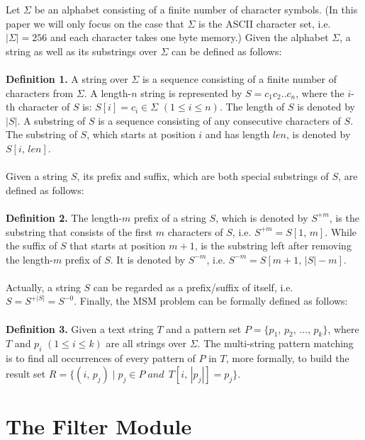 \documentclass{article}
\begin{document}
Let $\Sigma$ be an \textsf{alphabet} consisting of a finite number of
character symbols. (In this paper we will only focus on the case that
$\Sigma$ is the ASCII character set, i.e. $|\Sigma| = 256$ and each
character takes one byte memory.) Given the alphabet $\Sigma$, a
\textsf{string} as well as its \textsf{substrings} over
$\Sigma$ can be defined as follows:\\
\\
\textbf{Definition 1.} A \textsf{string} over $\Sigma$ is a sequence
consisting of a finite number of characters from $\Sigma$. A
length-$n$ string is represented by $S = c_1c_2..c_n$, where the
$i$-th character of $S$ is: $S[i] = c_i \in \Sigma$
$(1 \leq i \leq n)$. The length of $S$ is denoted by $|S|$. A
\textsf{substring} of $S$ is a sequence consisting of any consecutive
characters of $S$. The substring of $S$, which starts at
position $i$ and has length $len$, is denoted by $S[i,\,len]$.\\
\\
Given a string $S$, its \textsf{prefix} and \textsf{suffix},
which are both special substrings of $S$, are defined as follows:\\
\\
\textbf{Definition 2.} The length-$m$ \textsf{prefix} of a string $S$,
which is denoted by $S^{+m}$, is the substring that consists of the
first $m$ characters of $S$, i.e. $S^{+m}=S[1,\,m]$.  While the
\textsf{suffix} of $S$ that starts at position $m+1$, is the substring
left after removing the length-$m$ prefix of $S$. It is
denoted by $S^{-m}$, i.e. $S^{-m} = S[m+1,\,|S|-m]$.\\
\\
Actually, a string $S$ can be regarded as a prefix/suffix of itself,
i.e. $S=S^{+|S|}=S^{-0}$. Finally, the MSM problem can be
formally defined as follows: \\
\\
\textbf{Definition 3.} Given a text string $T$ and a pattern set
$P=\{p_1,\,p_2,\,\dots,\,p_k\}$, where $T$ and $p_i$
$(1 \leq i \leq k)$ are all strings over $\Sigma$.  The multi-string
pattern matching is to find all occurrences of every pattern of $P$ in
$T$, more formally, to build the result set
$R = \{(i,\, p_j)\;|\; p_j \in P\; and\,\; T[i,\,|p_j|]=p_j\}$.


\section{The Filter Module}
\label{sec:filter}
\end{document}
